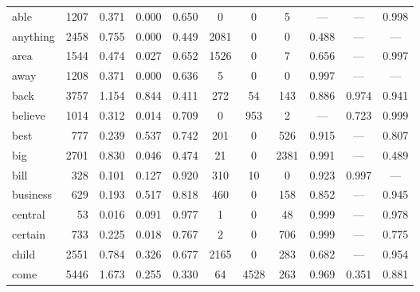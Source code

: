 \begin{landscape}
\begin{longtable}[c]{ l | r r c c | c c c | c c c }
  able       & 1207  & 0.371                   & 0.000           & 0.650      & 0         & 0           & 5            & —         & —           & 0.998\\
  anything   & 2458  & 0.755                   & 0.000           & 0.449      & 2081      & 0           & 0            & 0.488     & —           & —\\
  area       & 1544  & 0.474                   & 0.027           & 0.652      & 1526      & 0           & 7            & 0.656     & —           & 0.997\\
  away       & 1208  & 0.371                   & 0.000           & 0.636      & 5         & 0           & 0            & 0.997     & —           & —\\
  back       & 3757  & 1.154                   & 0.844           & 0.411      & 272       & 54          & 143          & 0.886     & 0.974       & 0.941\\
  believe    & 1014  & 0.312                   & 0.014           & 0.709      & 0         & 953         & 2            & —         & 0.723       & 0.999\\
  best       & 777   & 0.239                   & 0.537           & 0.742      & 201       & 0           & 526          & 0.915     & —           & 0.807\\
  big        & 2701  & 0.830                   & 0.046           & 0.474      & 21        & 0           & 2381         & 0.991     & —           & 0.489\\
  bill       & 328   & 0.101                   & 0.127           & 0.920      & 310       & 10          & 0            & 0.923     & 0.997       & —\\
  business   & 629   & 0.193                   & 0.517           & 0.818      & 460       & 0           & 158          & 0.852     & —           & 0.945\\
  central    & 53    & 0.016                   & 0.091           & 0.977      & 1         & 0           & 48           & 0.999     & —           & 0.978\\
  certain    & 733   & 0.225                   & 0.018           & 0.767      & 2         & 0           & 706          & 0.999     & —           & 0.775\\
  child      & 2551  & 0.784                   & 0.326           & 0.677      & 2165      & 0           & 283          & 0.682     & —           & 0.954\\
  come       & 5446  & 1.673                   & 0.255           & 0.330      & 64        & 4528        & 263          & 0.969     & 0.351       & 0.881\\

\end{longtable}
\end{landscape}
